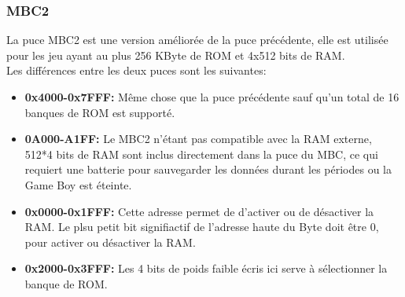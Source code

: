 \documentclass{report}
\begin{document}
\subsubsection{MBC2}
	La puce MBC2 est une version améliorée de la puce précédente, elle est utilisée pour les jeu ayant au plus 256 KByte de ROM et 4x512 bits de RAM.
\\Les différences entre les deux puces sont les suivantes:\\
\begin{itemize}
\item \textbf{0x4000-0x7FFF:} Même chose que la puce précédente sauf qu'un total de 16 banques de ROM est supporté.\\
\item \textbf{0A000-A1FF:} Le MBC2 n'étant pas compatible avec la RAM externe, 512*4 bits de RAM sont inclus directement dans la puce du MBC, ce qui requiert une batterie pour sauvegarder les données durant les périodes ou la Game Boy est éteinte.\\
\item \textbf{0x0000-0x1FFF:} Cette adresse permet de d'activer ou de désactiver la RAM. Le plsu petit bit signifiactif de l'adresse haute du Byte doit être 0, pour activer ou désactiver la RAM.\\
\item \textbf{0x2000-0x3FFF:} Les 4 bits de poids faible écris ici serve à sélectionner la banque de ROM.\\
\end{itemize}
\end{document}
